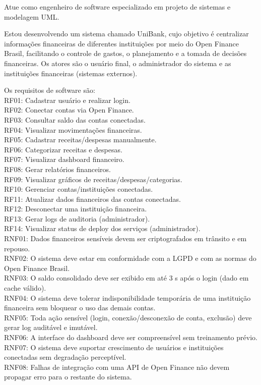 \documentclass[11pt,a4paper]{article}
\begin{document}
\begin{tcolorbox}[breakable, colback=promptfill, colframe=promptfill, boxrule=0pt, arc=2pt, left=8pt, right=8pt, top=6pt, bottom=6pt, fontupper=\footnotesize, before upper={\setlength{\parskip}{5pt}}]
Atue como engenheiro de software especializado em projeto de sistemas e modelagem UML.

Estou desenvolvendo um sistema chamado UniBank, cujo objetivo é centralizar informações financeiras de diferentes instituições por meio do Open Finance Brasil, facilitando o controle de gastos, o planejamento e a tomada de decisões financeiras. Os atores são o usuário final, o administrador do sistema e as instituições financeiras (sistemas externos).

Os requisitos de software são:\\
RF01: Cadastrar usuário e realizar login.\\
RF02: Conectar contas via Open Finance.\\
RF03: Consultar saldo das contas conectadas.\\
RF04: Visualizar movimentações financeiras.\\
RF05: Cadastrar receitas/despesas manualmente.\\
RF06: Categorizar receitas e despesas.\\
RF07: Visualizar dashboard financeiro.\\
RF08: Gerar relatórios financeiros.\\
RF09: Visualizar gráficos de receitas/despesas/categorias.\\
RF10: Gerenciar contas/instituições conectadas.\\
RF11: Atualizar dados financeiros das contas conectadas.\\
RF12: Desconectar uma instituição financeira.\\
RF13: Gerar logs de auditoria (administrador).\\
RF14: Visualizar status de deploy dos serviços (administrador).\\
RNF01: Dados financeiros sensíveis devem ser criptografados em trânsito e em repouso.\\
RNF02: O sistema deve estar em conformidade com a LGPD e com as normas do Open Finance Brasil.\\
RNF03: O saldo consolidado deve ser exibido em até 3 s após o login (dado em cache válido).\\
RNF04: O sistema deve tolerar indisponibilidade temporária de uma instituição financeira sem bloquear o uso das demais contas.\\
RNF05: Toda ação sensível (login, conexão/desconexão de conta, exclusão) deve gerar log auditável e imutável.\\
RNF06: A interface do dashboard deve ser compreensível sem treinamento prévio.\\
RNF07: O sistema deve suportar crescimento de usuários e instituições conectadas sem degradação perceptível.\\
RNF08: Falhas de integração com uma API de Open Finance não devem propagar erro para o restante do sistema.
\end{tcolorbox}
\end{document}

